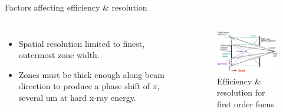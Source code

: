 \documentclass{beamer}
\def\tzpopt{t_{\rm zp,opt}} %
\def\tzpopt{t_{\rm zp,opt}} %
\begin{document}
\begin{frame}{Factors affecting efficiency \& resolution}
	\begin{block}{}
		\begin{columns}[onlytextwidth,T]
			\column{\dimexpr\linewidth-30mm-10mm}
			\begin{itemize}
				\item Spatial resolution limited to finest, outermost zone width.\footnotemark
				\item Zones must be thick enough along beam direction to produce a phase shift of $\pi$, several um at hard x-ray energy.\footnotemark
			\end{itemize}
			\column{30mm}
			\begin{figure}
				\hspace*{-1.1cm}\includegraphics[width=50mm]{zp_chris}
				\caption{Efficiency \& resolution for first order focus\footnotemark}
			\end{figure}
		\end{columns}
		\end{block}
		\addtocounter{footnote}{-2}
		
		\addtocounter{footnote}{-1}
		
\end{frame}
\end{document}
